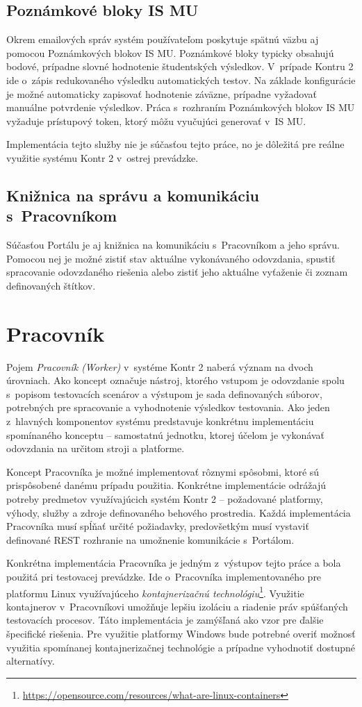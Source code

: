 \documentclass[
  digital, %
  oneside, %
  table,   %
  lof,     %
  lot,   %
]{fithesis3}
\begin{document}
\subsection{Poznámkové bloky IS MU}
Okrem emailových správ systém používateľom poskytuje spätnú väzbu aj pomocou Poznámkových blokov IS MU. Poznámkové bloky typicky obsahujú bodové, prípadne slovné hodnotenie študentských výsledkov. V~prípade Kontru 2 ide o~zápis redukovaného výsledku automatických testov. Na základe konfigurácie je možné automaticky zapisovať hodnotenie záväzne, prípadne vyžadovať manuálne potvrdenie výsledkov. Práca s~rozhraním Poznámkových blokov IS MU vyžaduje prístupový token, ktorý môžu vyučujúci generovať v~IS MU.

Implementácia tejto služby nie je súčasťou tejto práce, no je dôležitá pre reálne využitie systému Kontr 2 v~ostrej prevádzke.

\subsection{Knižnica na správu a komunikáciu s~Pracovníkom}
Súčasťou Portálu je aj knižnica na komunikáciu s~Pracovníkom a jeho správu. Pomocou nej je možné zistiť stav aktuálne vykonávaného odovzdania, spustiť spracovanie odovzdaného riešenia alebo zistiť jeho aktuálne vyťaženie či zoznam definovaných štítkov.

\section{Pracovník}
Pojem \emph{Pracovník (Worker)} v~systéme Kontr 2 naberá význam na dvoch úrovniach. Ako koncept označuje nástroj, ktorého vstupom je odovzdanie spolu s~popisom testovacích scenárov a výstupom je sada definovaných súborov, potrebných pre spracovanie a vyhodnotenie výsledkov testovania. Ako jeden z~hlavných komponentov systému predstavuje konkrétnu implementáciu spomínaného konceptu -- samostatnú jednotku, ktorej účelom je vykonávať odovzdania na určitom stroji a platforme. 

Koncept Pracovníka je možné implementovať rôznymi spôsobmi, ktoré sú prispôsobené danému prípadu použitia. Konkrétne implementácie odrážajú potreby predmetov využívajúcich systém Kontr 2 -- požadované platformy, výhody, služby a zdroje definovaného behového prostredia. Každá implementácia Pracovníka musí spĺňať určité požiadavky, predovšetkým musí vystaviť definované REST rozhranie na umožnenie komunikácie s~Portálom. 

Konkrétna implementácia Pracovníka je jedným z~výstupov tejto práce a bola použitá pri testovacej prevádzke. Ide o~Pracovníka implementovaného pre platformu Linux využívajúceho \emph{kontajnerizačnú technológiu}\footnote{\url{https://opensource.com/resources/what-are-linux-containers}}. Využitie kontajnerov v~Pracovníkovi umožňuje lepšiu izoláciu a riadenie práv spúšťaných testovacích procesov. Táto implementácia je zamýšľaná ako vzor pre ďalšie špecifické riešenia. Pre využitie platformy Windows bude potrebné overiť možnosť využitia spomínanej kontajnerizačnej technológie a prípadne vyhodnotiť dostupné alternatívy.
\end{document}
